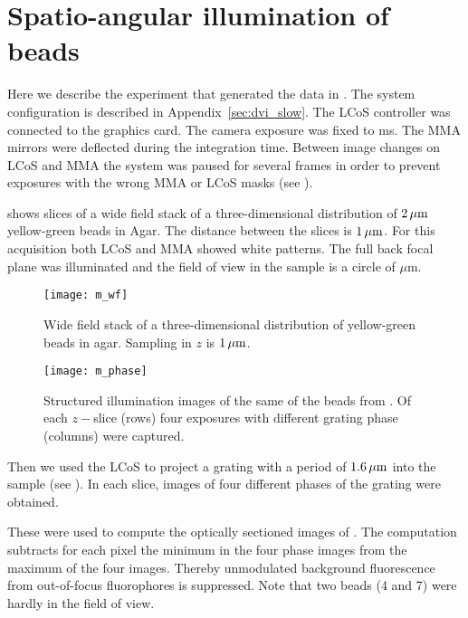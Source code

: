 \section{Spatio-angular illumination of beads}
Here we describe the experiment that generated the data in
. The system configuration is
described in Appendix~\ref{sec:dvi_slow}. The LCoS controller was
connected to the graphics card. The camera exposure was fixed to
\unit[16]{ms}. The MMA mirrors were deflected during the integration
time. Between image changes on LCoS and MMA the system was paused for
several frames in order to prevent exposures with the wrong MMA or
LCoS masks (see ).

 shows slices of a wide field stack of a
three-dimensional distribution of $\unit[2]{\mu m}$ yellow-green beads
in Agar. The distance between the slices is $\unit[1]{\mu m}$. For
this acquisition both LCoS and MMA showed white patterns. The full
back focal plane was illuminated and the field of view in the sample
is a circle of \unit[25]{$\mu$m}.

\begin{figure}[H]
  \centering
  \texttt{[image: m\_wf]}
  \caption{Wide field stack of a three-dimensional distribution of
    yellow-green beads in agar. Sampling in $z$ is $\unit[1]{\mu m}$.}
  \label{fig:m_wf}
\end{figure}

\begin{figure}[H]
  \centering
  \texttt{[image: m\_phase]}
  \caption{Structured illumination images of the same of the beads
    from . Of each $z-$slice (rows) four exposures
    with different grating phase (columns) were captured.}
  \label{fig:m_phase}
\end{figure}



Then we used the LCoS to project a grating with a period of
$\unit[1.6]{\mu m}$ into the sample (see ). In
each slice, images of four different phases of the grating were
obtained. 

These were used to compute the optically sectioned images of
. The computation subtracts for each pixel the
minimum in the four phase images from the maximum of the four
images. Thereby unmodulated background fluorescence from out-of-focus
fluorophores is suppressed. Note that two beads (4 and 7) were hardly
in the field of view.

